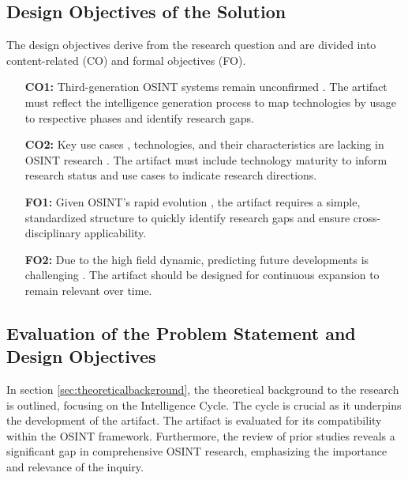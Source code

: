\documentclass[10pt]{article}
\begin{document}
\subsection{Design Objectives of the Solution} \label{sec:designobjectives}


The design objectives derive from the research question \cite{Peffers.2007} and are divided into content-related (CO) and formal objectives (FO).

\begin{itemize}
    \item[\textbf{CO1:}] Third-generation OSINT systems remain unconfirmed \cite{Ghioni.2023}. The artifact must reflect the intelligence generation process to map technologies by usage to respective phases and identify research gaps.
    \item[\textbf{CO2:}] Key use cases \cite{AlKilani.2021}, technologies, and their characteristics are lacking in OSINT research \cite{Ghioni.2023,Ish.2022}. The artifact must include technology maturity to inform research status and use cases to indicate research directions.
    \item[\textbf{FO1:}] Given OSINT's rapid evolution \cite{Ghioni.2023}, the artifact requires a simple, standardized structure to quickly identify research gaps and ensure cross-disciplinary applicability.
    \item[\textbf{FO2:}] Due to the high field dynamic, predicting future developments is challenging \cite{Benes.2013}. The artifact should be designed for continuous expansion to remain relevant over time.
\end{itemize}

\subsection{Evaluation of the Problem Statement and Design Objectives} \label{sec:eval}
In section \ref{sec:theoreticalbackground}, the theoretical background to the research is outlined, focusing on the Intelligence Cycle. The cycle is crucial as it underpins the development of the artifact. The artifact is evaluated for its compatibility within the OSINT framework. Furthermore, the review of prior studies reveals a significant gap in comprehensive OSINT research, emphasizing the importance and relevance of the inquiry.
\end{document}
